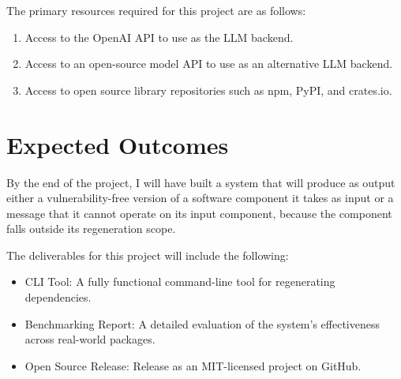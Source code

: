 \documentclass[a4paper,twoside,11pt]{report} %
\begin{document}
The primary resources required for this project are as follows:

\begin{enumerate}
    \item Access to the OpenAI API to use as the LLM backend.
    \item Access to an open-source model API to use as an alternative LLM backend.
    \item Access to open source library repositories such as npm, PyPI, and crates.io.
\end{enumerate}

\section*{Expected Outcomes}
By the end of the project, I will have built a system that will produce as
output either a vulnerability-free version of a software component it takes as
input or a message that it cannot operate on its input component, because the
component falls outside its regeneration scope.

The deliverables for this project will include the following:

\begin{itemize}
  \item	CLI Tool: A fully functional command-line tool for regenerating dependencies.
	\item	Benchmarking Report: A detailed evaluation of the system's effectiveness across real-world packages.
	\item	Open Source Release: Release as an MIT-licensed project on GitHub.
\end{itemize}



\printbibliography[heading=bibintoc,title={Bibliography}]

\end{document}

